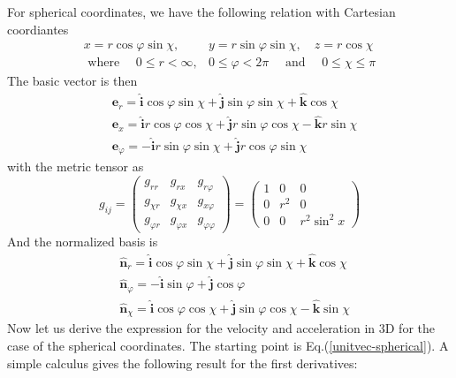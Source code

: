 For spherical coordinates, we have
the following relation with Cartesian coordiantes
$$
\begin{aligned}
x=r \cos \varphi \sin \chi, & y=r \sin \varphi \sin \chi, \quad z=r \cos \chi \\
\text { where } \quad 0 \leq r<\infty, & 0 \leq \varphi<2 \pi \quad \text { and } \quad 0 \leq \chi \leq \pi
\end{aligned}
$$
The basic vector is then
$$
\begin{aligned}
&\mathbf{e}_{r}=\hat{\mathbf{i}} \cos \varphi \sin \chi+\hat{\mathbf{j}} \sin \varphi \sin \chi+\hat{\mathbf{k}} \cos \chi\\
&\mathbf{e}_{x}=\hat{\mathbf{i}} r \cos \varphi \cos \chi+\hat{\mathbf{j}} r \sin \varphi \cos \chi-\hat{\mathbf{k}} r \sin \chi\\
&\mathbf{e}_{\varphi}=-\hat{\mathbf{i}} r \sin \varphi \sin \chi+\hat{\mathbf{j}} r \cos \varphi \sin \chi
\end{aligned}
$$
with the metric tensor as
$$
g_{i j}=\left(\begin{array}{lll}
{g_{r r}} & {g_{r x}} & {g_{r \varphi}} \\
{g_{\chi r}} & {g_{\chi x}} & {g_{x \varphi}} \\
{g_{\varphi r}} & {g_{\varphi x}} & {g_{\varphi \varphi}}
\end{array}\right)=\left(\begin{array}{ccc}
{1} & {0} & {0} \\
{0} & {r^{2}} & {0} \\
{0} & {0} & {r^{2} \sin ^{2} x}
\end{array}\right)
$$
And the normalized basis is
\begin{equation}
    \begin{aligned}
&\hat{\mathbf{n}}_{r}=\hat{\mathbf{i}} \cos \varphi \sin \chi+\hat{\mathbf{j}} \sin \varphi \sin \chi+\hat{\mathbf{k}} \cos \chi\\
&\hat{\mathbf{n}}_{\varphi}=-\hat{\mathbf{i}} \sin \varphi+\hat{\mathbf{j}} \cos \varphi\\
&\hat{\mathbf{n}}_{\chi}=\hat{\mathbf{i}} \cos \varphi \cos \chi+\hat{\mathbf{j}} \sin \varphi \cos \chi-\hat{\mathbf{k}} \sin \chi
\end{aligned}
\label{unitvec-spherical}
\end{equation}
Now let us derive the expression for the velocity and acceleration in 3D for the case of the spherical coordinates. The starting point is Eq.(\ref{unitvec-spherical}). A simple calculus gives the following result for the first derivatives:
